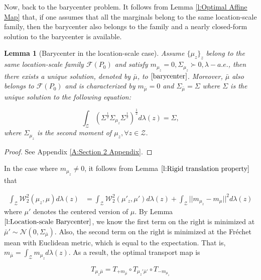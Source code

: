 \documentclass[twoside,11pt]{article}
\newtheorem{lem}{Lemma}[section]{\bfseries}{\itshape}
\begin{document}
Now, back to the barycenter problem. It follows from Lemma \ref{l:Optimal Affine Map} that, if one assumes that all the marginals belong to the same location-scale family, then the barycenter also belongs to the family and a nearly closed-form solution to the barycenter is available.

\begin{lem}[Barycenter in the location-scale case] \label{l:Location-scale Barycenter}
Assume $\{\mu_z\}_z$ belong to the same location-scale family $\mathcal{F}(P_0)$ and satisfy $m_{\mu_z} = 0, \Sigma_{\mu_z} \succ 0, \lambda-a.e.$, then there exists a unique solution, denoted by $\bar{\mu}$, to $\eqref{barycenter}$. Moreover, $\bar{\mu}$ also belongs to $\mathcal{F}(P_0)$ and is characterized by $m_{\bar{\mu}} = 0$ and $\Sigma_{\bar{\mu}} = \Sigma$ where $\Sigma$ is the unique solution to the following equation:

\begin{equation}\label{barycenter equation}
\int_{\mathcal{Z}} (\Sigma^{\frac{1}{2}} \Sigma_{\mu_z} \Sigma^{\frac{1}{2}})^{\frac{1}{2}} d\lambda(z) = \Sigma,
\end{equation}
where $\Sigma_{\mu_z}$ is the second moment of $\mu_z, \forall z \in \mathcal{Z}$.

\end{lem}

\begin{proof}
See Appendix \ref{A:Section 2 Appendix}.
\end{proof}

In the case where $m_{\mu_z} \neq 0$, it follows from Lemma $\ref{l:Rigid translation property}$ that

\begin{align*}
\int_{\mathcal{Z}} \mathcal{W}_2^2(\mu_z,\mu) d\lambda(z) & = \int_{\mathcal{Z}} \mathcal{W}_2^2(\mu'_z,\mu') d\lambda(z) + \int_{\mathcal{Z}} ||m_{\mu_z} - m_{\mu}||^2 d\lambda(z) 
\end{align*}
where $\mu'$ denotes the centered version of $\mu$. By Lemma $\ref{l:Location-scale Barycenter}$, we know the first term on the right is minimized at $\bar{\mu}' \sim \mathcal{N}(0,\Sigma_{\bar{\mu}})$. Also, the second term on the right is minimized at the Fr\'{e}chet mean with Euclidean metric, which is equal to the expectation. That is, $m_{\bar{\mu}} = \int_{\mathcal{Z}} m_{\mu_z} d\lambda(z)$. As a result, the optimal transport map is

\begin{equation} \label{eq:rigid translation composition}
T_{\mu_z \bar{\mu}} = T_{+m_{\bar{\mu}}} \circ T_{\mu_z' \bar{\mu}'} \circ T_{-m_{\mu_z}}
\end{equation}
\end{document}
